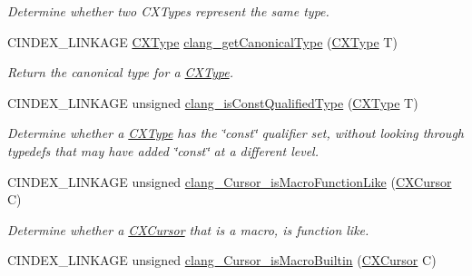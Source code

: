 \begin{DoxyCompactItemize}
\begin{DoxyCompactList}\small\item\em Determine whether two C\+X\+Types represent the same type. \end{DoxyCompactList}\item 
C\+I\+N\+D\+E\+X\+\_\+\+L\+I\+N\+K\+A\+GE \hyperlink{structCXType}{C\+X\+Type} \hyperlink{group__CINDEX__TYPES_gaa9815d77adc6823c58be0a0e32010f8c}{clang\+\_\+get\+Canonical\+Type} (\hyperlink{structCXType}{C\+X\+Type} T)
\begin{DoxyCompactList}\small\item\em Return the canonical type for a \hyperlink{structCXType}{C\+X\+Type}. \end{DoxyCompactList}\item 
\mbox{\label{group__CINDEX__TYPES_ga8c3f8029254d5862bcd595d6c8778e5b}} 
C\+I\+N\+D\+E\+X\+\_\+\+L\+I\+N\+K\+A\+GE unsigned \hyperlink{group__CINDEX__TYPES_ga8c3f8029254d5862bcd595d6c8778e5b}{clang\+\_\+is\+Const\+Qualified\+Type} (\hyperlink{structCXType}{C\+X\+Type} T)
\begin{DoxyCompactList}\small\item\em Determine whether a \hyperlink{structCXType}{C\+X\+Type} has the \char`\"{}const\char`\"{} qualifier set, without looking through typedefs that may have added \char`\"{}const\char`\"{} at a different level. \end{DoxyCompactList}\item 
\mbox{\label{group__CINDEX__TYPES_ga0fcb19b77fa3eb1dd531bb8f20f65e6c}} 
C\+I\+N\+D\+E\+X\+\_\+\+L\+I\+N\+K\+A\+GE unsigned \hyperlink{group__CINDEX__TYPES_ga0fcb19b77fa3eb1dd531bb8f20f65e6c}{clang\+\_\+\+Cursor\+\_\+is\+Macro\+Function\+Like} (\hyperlink{structCXCursor}{C\+X\+Cursor} C)
\begin{DoxyCompactList}\small\item\em Determine whether a \hyperlink{structCXCursor}{C\+X\+Cursor} that is a macro, is function like. \end{DoxyCompactList}\item 
\mbox{\label{group__CINDEX__TYPES_gad5ddc0fd032716a88cddc14558e0d914}} 
C\+I\+N\+D\+E\+X\+\_\+\+L\+I\+N\+K\+A\+GE unsigned \hyperlink{group__CINDEX__TYPES_gad5ddc0fd032716a88cddc14558e0d914}{clang\+\_\+\+Cursor\+\_\+is\+Macro\+Builtin} (\hyperlink{structCXCursor}{C\+X\+Cursor} C)

\end{DoxyCompactItemize}
